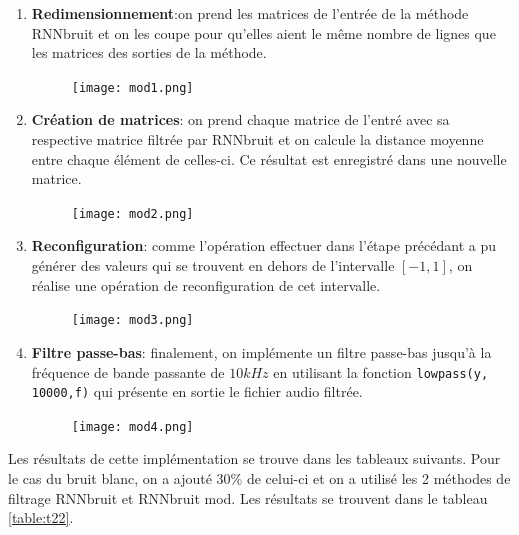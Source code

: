 \documentclass[conference,onecolumn]{IEEEtran}
\begin{document}
\begin{enumerate} %
    \item \textbf{Redimensionnement}:on prend les matrices de l’entrée de la méthode RNNbruit et on les coupe pour qu’elles aient le même nombre de lignes que les matrices des sorties de la méthode.
    
        \begin{figure}[H]
            \centering
            \texttt{[image: mod1.png]}
        \end{figure}
    
    \item \textbf{Création de matrices}: on prend chaque matrice de l’entré avec sa respective matrice filtrée par RNNbruit et on calcule la distance moyenne entre chaque élément de celles-ci. Ce résultat est enregistré dans une nouvelle matrice.
 
        \begin{figure}[H]
            \centering
            \texttt{[image: mod2.png]}
        \end{figure}
    
    \item \textbf{Reconfiguration}: comme l’opération effectuer dans l’étape précédant a pu générer des valeurs qui se trouvent en dehors de l’intervalle $[-1,1]$, on réalise une opération de reconfiguration de cet intervalle.
    
        \begin{figure}[H]
            \centering
            \texttt{[image: mod3.png]}
        \end{figure}    
    
    \item \textbf{Filtre passe-bas}: finalement, on implémente un filtre passe-bas jusqu’à la fréquence de bande passante de $10 kHz$ en utilisant la fonction \texttt{lowpass(y, 10000,f)} qui présente en sortie le fichier audio filtrée.
    
        \begin{figure}[H]
            \centering
            \texttt{[image: mod4.png]}
        \end{figure}    
    
\end{enumerate}

Les résultats de cette implémentation se trouve dans les tableaux suivants. Pour le cas du bruit blanc, on a ajouté 30\% de celui-ci et on a utilisé les 2 méthodes de filtrage RNNbruit et RNNbruit mod. Les résultats se trouvent dans le tableau \ref{table:t22}.
\end{document}

